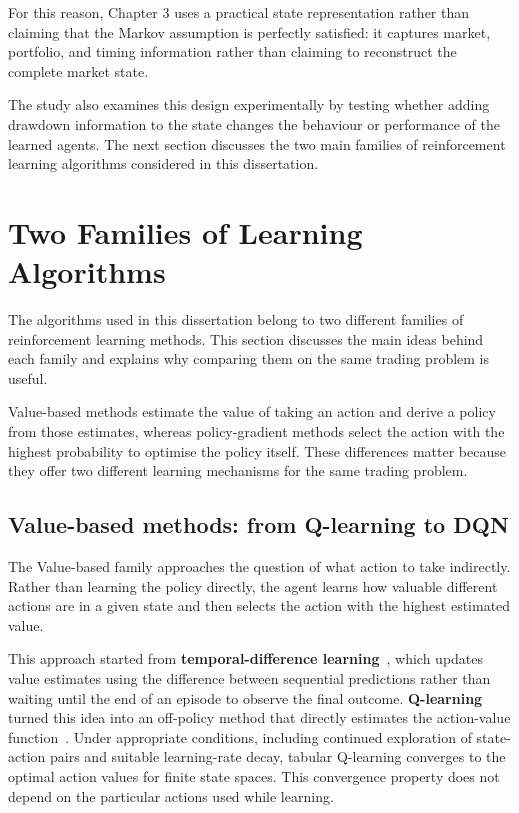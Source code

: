 For this reason, Chapter 3 uses a practical state representation rather
than claiming that the Markov assumption is perfectly satisfied: it
captures market, portfolio, and timing information rather than claiming
to reconstruct the complete market state.

The study also examines this design experimentally by testing whether
adding drawdown information to the state changes the behaviour or
performance of the learned agents. The next section discusses the two
main families of reinforcement learning algorithms considered in this
dissertation.

\section{Two Families of Learning Algorithms}
The algorithms used in this dissertation belong to two different
families of reinforcement learning methods. This section discusses the
main ideas behind each family and explains why comparing them on the
same trading problem is useful.

Value-based methods estimate the value of taking an action and derive a
policy from those estimates, whereas policy-gradient methods select the
action with the highest probability to optimise the policy itself. These
differences matter because they offer two different learning mechanisms
for the same trading problem.

\subsection{Value-based methods: from Q-learning to DQN}
The Value-based family approaches the question of what action to take
indirectly. Rather than learning the policy directly, the agent learns
how valuable different actions are in a given state and then selects the
action with the highest estimated value.

This approach started from \textbf{temporal-difference learning}~\cite{sutton1988}, which updates value estimates using the difference between
sequential predictions rather than waiting until the end of an episode
to observe the final outcome. \textbf{Q-learning} turned this idea into
an off-policy method that directly estimates the action-value function~\cite{watkins1992}. Under appropriate conditions, including continued exploration
of state-action pairs and suitable learning-rate decay, tabular
Q-learning converges to the optimal action values for finite state
spaces. This convergence property does not depend on the particular
actions used while learning.

